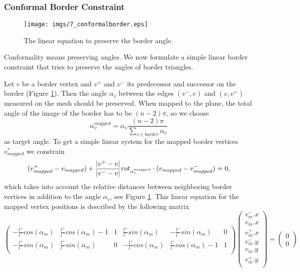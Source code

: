 \subsubsection*{Conformal Border Constraint}

\begin{figure}%
\begin{center}
\texttt{[image: imgs/7\_conformalborder.eps]}%
\end{center}

\caption{The linear equation to preserve the border angle.}%
\label{fig:6_conformalBorder}%
\end{figure}
Conformality means preserving angles. We now formulate a simple linear border constraint that tries to preserve the angles of border triangles. 

Let $v$ be a border vertex and $v^+$ and $v^-$ its predecessor and successor on the border (Figure \ref{fig:6_conformalBorder}). Then the angle $\alpha_v$ between the edges $(v^-,v)$ and $(v,v^+)$ measured on the mesh
should be preserved. When mapped to the plane, the total angle of the image of the border has to be $(n-2)\pi$, so we choose
\begin{equation}\alpha_v^{mapped} = \alpha_v \frac{(n-2) \pi}{\sum_{v \in border} \alpha_v}\label{eq:conformalAngles}\end{equation}
as target angle. To get a simple linear system for the mapped border vertices $v_{mapped}^*$ we constrain
\begin{equation} (v^+_{mapped}-v_{mapped} ) + \frac{\left| v^+-v \right|}{\left| v^- -v \right|}rot_{\alpha_v^{mapped}} \cdot (v_{mapped} - v_{mapped}^- )= 0,\label{eq:conformalBorder}\end{equation}
which takes into account the relative distances between neighboring border vertices in addition to the angle $\alpha_v$, see Figure \ref{fig:6_conformalBorder}. This linear equation for the mapped vertex positions is described by the following matrix
\[\begin{pmatrix}
-\frac{l^+}{l^-}cos(\alpha_{m})& \frac{l^+}{l^-}cos(\alpha_{m}) -1 & 1 & \frac{l^+}{l^-}sin(\alpha_{m}) & -\frac{l^+}{l^-}sin(\alpha_{m}) & 0\\
-\frac{l^+}{l^-}sin(\alpha_{m}) & \frac{l^+}{l^-}sin(\alpha_{m})  & 0  & - \frac{l^+}{l^-}cos(\alpha_{m}) & \frac{l^+}{l^-}cos(\alpha_{m}) -1 & 1\\
 
\end{pmatrix} \begin{pmatrix}
v_{m}^-.x \\
v_{m}.x \\
v_{m}^+.x \\
v_{m}^-.y \\
v_{m}.y \\
v_{m}^+.y \\
\end{pmatrix} = \begin{pmatrix}
0 \\
0
\end{pmatrix}\]

